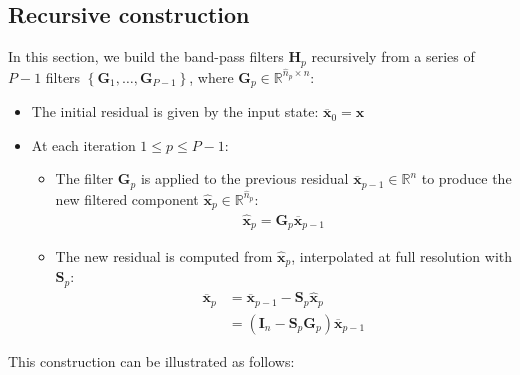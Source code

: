 \documentclass[12pt]{scrartcl}
\begin{document}
\subsection{Recursive construction}
In this section, we build the band-pass filters $\mathbf{H}_p$ recursively from a series of $P-1$ filters $\left\{\mathbf{G}_1,\dots,\mathbf{G}_{P-1}\right\}$, where $\mathbf{G}_p \in \mathbb{R}^{\widehat{n}_p \times n}$:
\begin{itemize}
\item The initial residual is given by the input state: $\overline{\mathbf{x}}_0 = \mathbf{x}$
\item At each iteration $1 \le p \le P-1$:
\begin{itemize}
\item The filter $\mathbf{G}_p$ is applied to the previous residual $\overline{\mathbf{x}}_{p-1} \in \mathbb{R}^n$ to produce the new filtered component $\widehat{\mathbf{x}}_p \in \mathbb{R}^{\widehat{n}_p}$:
\begin{align}
\label{eq:lp1}
\widehat{\mathbf{x}}_p = \mathbf{G}_p \overline{\mathbf{x}}_{p-1}
\end{align}
\item The new residual is computed from $\widehat{\mathbf{x}}_p$, interpolated at full resolution with $\mathbf{S}_p$:
\begin{align}
\label{eq:lp2}
\overline{\mathbf{x}}_p & = \overline{\mathbf{x}}_{p-1} - \mathbf{S}_p \widehat{\mathbf{x}}_p \\
& = \left(\mathbf{I}_n - \mathbf{S}_p \mathbf{G}_p\right) \overline{\mathbf{x}}_{p-1}
\end{align}
\end{itemize}
\end{itemize}
This construction can be illustrated as follows:
\end{document}
